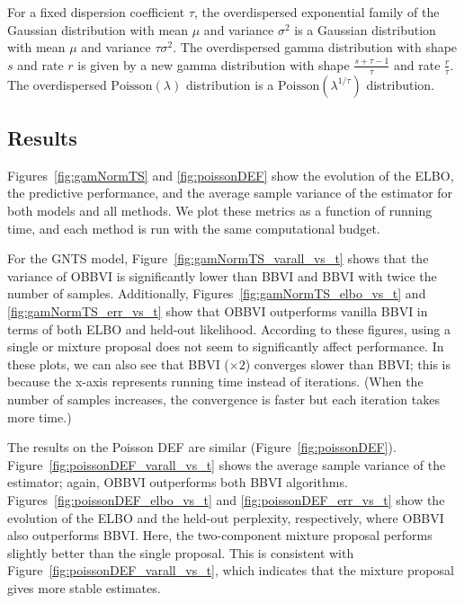 For a fixed dispersion coefficient $\tau$, the overdispersed
exponential family of the Gaussian distribution with mean $\mu$ and
variance $\sigma^2$ is a Gaussian distribution with mean $\mu$ and
variance $\tau\sigma^2$. The overdispersed gamma distribution with
shape $s$ and rate $r$ is given by a new gamma distribution with shape
$\frac{s+\tau-1}{\tau}$ and rate $\frac{r}{\tau}$. The overdispersed
$\textrm{Poisson}(\lambda)$ distribution is a
$\textrm{Poisson}(\lambda^{1/\tau})$ distribution.

\vspace*{-5pt}
\subsection{Results}
\label{sec:results}
\vspace*{-5pt}

Figures~\ref{fig:gamNormTS} and \ref{fig:poissonDEF} show the
evolution of the \gls{ELBO}, the predictive performance, and the
average sample variance of the estimator for both models and all
methods. We plot these metrics as a function of running time, and
each method is run with the same computational budget.

For the \gls{GNTS} model, Figure~\ref{fig:gamNormTS_varall_vs_t} shows
that the variance of \gls{OBBVI} is significantly lower than
\gls{BBVI} and \gls{BBVI} with twice the number of samples.
Additionally, Figures~\ref{fig:gamNormTS_elbo_vs_t} and
\ref{fig:gamNormTS_err_vs_t} show that \gls{OBBVI} outperforms vanilla
\gls{BBVI} in terms of both \gls{ELBO} and held-out likelihood.
According to these figures, using a single or mixture proposal does
not seem to significantly affect performance. In these plots, we can
also see that \gls{BBVI} ($\times 2$) converges slower than \gls{BBVI};
this is because the x-axis represents running time instead of iterations.
(When the number of samples increases, the convergence is faster
but each iteration takes more time.)

The results on the Poisson \gls{DEF} are similar
(Figure~\ref{fig:poissonDEF}). Figure~\ref{fig:poissonDEF_varall_vs_t}
shows the average sample variance of the estimator; again, \gls{OBBVI}
outperforms both \gls{BBVI} algorithms.
Figures~\ref{fig:poissonDEF_elbo_vs_t} and
\ref{fig:poissonDEF_err_vs_t} show the evolution of the \gls{ELBO} and
the held-out perplexity, respectively, where \gls{OBBVI} also outperforms
\gls{BBVI}. Here, the two-component mixture proposal performs slightly better than
the single proposal. This is consistent with
Figure~\ref{fig:poissonDEF_varall_vs_t}, which indicates that the
mixture proposal gives more stable estimates.

